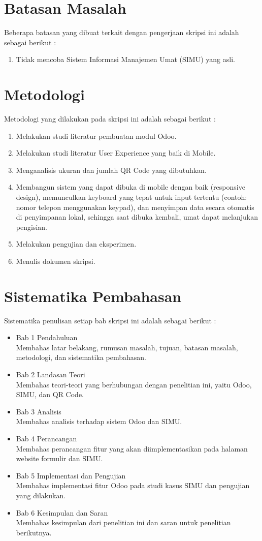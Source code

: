 \section{Batasan Masalah}
\label{sec:batasan}
Beberapa batasan yang dibuat terkait dengan pengerjaan skripsi ini adalah sebagai berikut :
\begin{enumerate}
	\item Tidak mencoba Sistem Informasi Manajemen Umat (SIMU) yang asli.
\end{enumerate}


\section{Metodologi}
\label{sec:metlit}
Metodologi yang dilakukan pada skripsi ini adalah sebagai berikut :
\begin{enumerate}
	\item Melakukan studi literatur pembuatan modul Odoo.
	\item Melakukan studi literatur User Experience yang baik di Mobile.
	\item Menganalisis ukuran dan jumlah QR Code yang dibutuhkan.
	\item Membangun sistem yang dapat dibuka di mobile dengan baik (responsive design), memunculkan keyboard yang tepat untuk input tertentu (contoh: nomor telepon menggunakan keypad), dan menyimpan data secara otomatis di penyimpanan lokal, sehingga saat dibuka kembali, umat dapat melanjukan pengisian.
	\item Melakukan pengujian dan eksperimen.
	\item Menulis dokumen skripsi.
\end{enumerate}


\section{Sistematika Pembahasan}
\label{sec:sispem}
Sistematika penulisan setiap bab skripsi ini adalah sebagai berikut :
\begin{itemize}
	\item Bab 1 Pendahuluan \\
	Membahas latar belakang, rumusan masalah, tujuan, batasan masalah, metodologi, dan sistematika pembahasan.
	\item Bab 2 Landasan Teori \\
	Membahas teori-teori yang berhubungan dengan penelitian ini, yaitu Odoo, SIMU, dan QR Code.
	\item Bab 3 Analisis \\
	Membahas analisis terhadap sistem Odoo dan SIMU.
	\item Bab 4 Perancangan \\
	Membahas perancangan fitur yang akan diimplementasikan pada halaman website formulir dan SIMU.
	\item Bab 5 Implementasi dan Pengujian \\
	Membahas implementasi fitur Odoo pada studi kasus SIMU dan pengujian yang dilakukan.
	\item Bab 6 Kesimpulan dan Saran \\
	Membahas kesimpulan dari penelitian ini dan saran untuk penelitian berikutnya.
\end{itemize}
